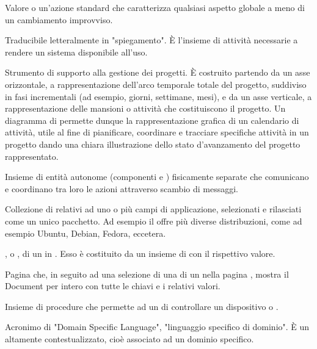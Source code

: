 {Valore o un'azione standard che caratterizza qualsiasi aspetto globale a meno di un cambiamento improvviso.}

{Traducibile letteralmente in "spiegamento". \`{E} l'insieme di attività necessarie a rendere un sistema  disponibile all'uso.}

{Strumento di supporto alla gestione dei progetti. \`{E} costruito partendo da un asse orizzontale, a rappresentazione dell'arco temporale totale del progetto, suddiviso in fasi incrementali (ad esempio, giorni, settimane, mesi), e da un asse verticale, a rappresentazione delle mansioni o attività che costituiscono il progetto. Un diagramma di  permette dunque la rappresentazione grafica di un calendario di attività, utile al fine di pianificare, coordinare e tracciare specifiche attività in un progetto dando una chiara illustrazione dello stato d'avanzamento del progetto rappresentato.} 

{Insieme di entità autonome (componenti  e ) fisicamente separate che comunicano e coordinano tra loro le azioni attraverso scambio di messaggi.}

{Collezione di  relativi ad uno o più campi di applicazione, selezionati e rilasciati come un unico pacchetto. Ad esempio il   offre più diverse distribuzioni, come ad esempio Ubuntu, Debian, Fedora, eccetera.}

{, o , di un  in . Esso è costituito da un insieme di  con il rispettivo valore.}

{Pagina che, in seguito ad una selezione di una  di un  nella pagina , mostra il Document per intero con tutte le chiavi e i relativi valori.}

{Insieme di procedure che permette ad un  di controllare un dispositivo  o .}

{Acronimo di "Domain Specific Language", "linguaggio specifico di dominio". \`{E} un  altamente contestualizzato, cioè associato ad un dominio specifico.} 




